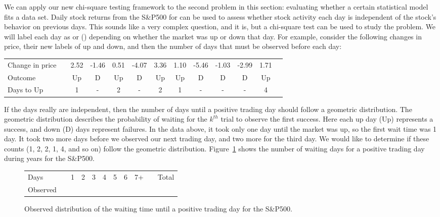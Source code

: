 We can apply our new chi-square testing framework to the
second problem in this section:
evaluating whether a certain statistical model fits
a data set.
Daily stock returns from the S\&P500 for \spyears{} can be used to assess whether stock activity each day is independent of the stock's behavior on previous days. This sounds like a very complex question, and it is, but a chi-square test can be used to study the problem. We will label each day as  or  () depending on whether the market was up or down that day. For example, consider the following changes in price, their new labels of up and down, and then the number of days that must be observed before each  day:
\begin{center}\footnotesize
\begin{tabular}{lc ccc ccc ccc cc}
Change in price		&\hspace{-1mm}	& \footnotesize2.52 &
	\footnotesize-1.46 & \footnotesize 0.51 &
	\footnotesize-4.07 & \footnotesize3.36 &
	\footnotesize1.10 &
	\footnotesize-5.46 & \footnotesize-1.03 & \footnotesize-2.99 & \footnotesize1.71 \\
Outcome	 & \hspace{-1mm} &
	Up &
	D & Up &
	D & Up &
	Up &
	D & D & D & Up \\
\footnotesize Days to Up & \hspace{-1mm} & 1 & - & 2 & - & 2 & 1 & - & - & - & 4 \\
\end{tabular}
\end{center}
If the days really are independent, then the number of days until a positive trading day should follow a geometric distribution. The geometric distribution describes the probability of waiting for the $k^{th}$ trial to observe the first success. Here each up day (Up) represents a success, and down (D) days represent failures. In the data above, it took only one day until the market was up, so the first wait time was 1 day. It took two more days before we observed our next  trading day, and two more for the third  day. We would like to determine if these counts (1, 2, 2, 1, 4, and so on) follow the geometric distribution. Figure~\ref{sAndP500TimeToPosTrade} shows the number of waiting days for a positive trading day during \spyears{} years for the S\&P500.

\begin{figure}[h]
\centering
\begin{tabular}{ll ccc ccc c ll}
  \hline
  Days	 & \hspace{2mm} & 1 & 2 & 3 & 4 & 5 & 6 & 7+ &
      \hspace{2mm} & Total \\
  Observed &		& \spdaysA{} & \spdaysB{} & \spdaysC{} &
      \spdaysD{} & \spdaysE{} & \spdaysF{} & \spdaysG{} & &
      \spdays{} \\
  \hline
\end{tabular}
\caption{Observed distribution of the waiting time until
    a positive trading day for the S\&P500.}
\label{sAndP500TimeToPosTrade}
\end{figure}

